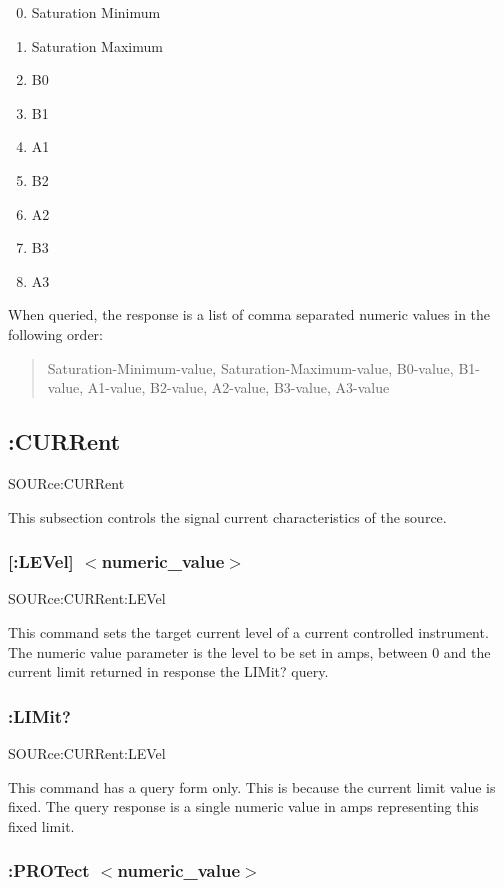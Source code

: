 \begin{enumerate}\setcounter{enumi}{-1} \item Saturation Minimum \item Saturation Maximum \item B0 \item B1 \item A1 \item B2 \item A2 \item B3 \item A3 \end{enumerate}

When queried, the response is a list of comma separated numeric values in the following order\-: \begin{quotation}
Saturation-\/\-Minimum-\/value, Saturation-\/\-Maximum-\/value, B0-\/value, B1-\/value, A1-\/value, B2-\/value, A2-\/value, B3-\/value, A3-\/value

\end{quotation}
\hypertarget{a00002_sourcurr}{}\subsection{\-:\-C\-U\-R\-Rent}\label{a00002_sourcurr}
{\ttfamily S\-O\-U\-Rce\-:C\-U\-R\-Rent}\par
 This subsection controls the signal current characteristics of the source.\hypertarget{a00002_sourcurrlev}{}\subsubsection{\mbox{[}\-:\-L\-E\-Vel\mbox{]} $<$numeric\-\_\-value$>$}\label{a00002_sourcurrlev}
{\ttfamily S\-O\-U\-Rce\-:\-C\-U\-R\-Rent\-:L\-E\-Vel}\par
 This command sets the target current level of a current controlled instrument. The numeric value parameter is the level to be set in amps, between 0 and the current limit returned in response the L\-I\-Mit? query.\hypertarget{a00002_sourcurrlim}{}\subsubsection{\-:\-L\-I\-Mit?}\label{a00002_sourcurrlim}
{\ttfamily S\-O\-U\-Rce\-:\-C\-U\-R\-Rent\-:L\-E\-Vel}\par
 This command has a query form only. This is because the current limit value is fixed. The query response is a single numeric value in amps representing this fixed limit.\hypertarget{a00002_sourcurrprot}{}\subsubsection{\-:\-P\-R\-O\-Tect $<$numeric\-\_\-value$>$}\label{a00002_sourcurrprot}
